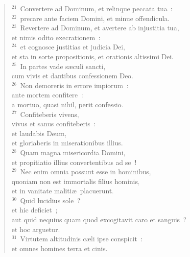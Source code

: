 \begin{flushleft}\begin{verse}${}^{21}$~Convertere ad Dominum, et relinque peccata tua~:\\
${}^{22}$~precare ante faciem Domini, et minue offendicula.\\
${}^{23}$~Revertere ad Dominum, et avertere ab injustitia tua,\\ et nimis odito execrationem~:\\
${}^{24}$~et cognosce justitias et judicia Dei,\\ et sta in sorte propositionis, et orationis altissimi Dei.\\
${}^{25}$~In partes vade s\ae culi sancti,\\ cum vivis et dantibus confessionem Deo.\\
${}^{26}$~Non demoreris in errore impiorum~:\\ ante mortem confitere~:\\ a mortuo, quasi nihil, perit confessio.\\
${}^{27}$~Confiteberis vivens,\\ vivus et sanus confiteberis~:\\ et laudabis Deum,\\ et gloriaberis in miserationibus illius.\\
${}^{28}$~Quam magna misericordia Domini,\\ et propitiatio illius convertentibus ad se~!\\
${}^{29}$~Nec enim omnia possunt esse in hominibus,\\ quoniam non est immortalis filius hominis,\\ et in vanitate maliti\ae\ placuerunt.\\
${}^{30}$~Quid lucidius sole~?\\ et hic deficiet~;\\ aut quid nequius quam quod excogitavit caro et sanguis~?\\ et hoc arguetur.\\
${}^{31}$~Virtutem altitudinis c\ae li ipse conspicit~:\\ et omnes homines terra et cinis.\end{verse}\end{flushleft}


